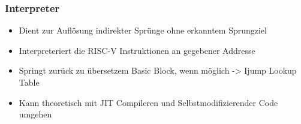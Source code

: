 \begin{frame}
    \frametitle{Interpreter}
    \vspace{1cm}
    \begin{itemize}
        \setlength{\itemsep}{1em}
        \item Dient zur Auflösung indirekter Sprünge ohne erkanntem Sprungziel
        \item Interpreteriert die RISC-V Instruktionen an gegebener Addresse
        \item Springt zurück zu übersetzem Basic Block, wenn möglich -> Ijump Lookup Table
        \item Kann theoretisch mit JIT Compileren und Selbstmodifizierender Code umgehen
    \end{itemize}
\end{frame}
\clearpage

